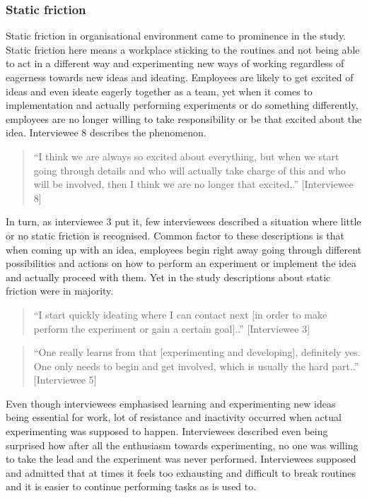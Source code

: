 \subsubsection{Static friction}
Static friction in organisational environment came to prominence in the study.  Static friction here means a workplace sticking to the routines and not being able to act in a different way and experimenting new ways of working regardless of eagerness towards new ideas and ideating. Employees are likely to get excited of ideas and even ideate eagerly together as a team, yet when it comes to implementation and actually performing experiments or do something differently, employees are no longer willing to take responsibility or be that excited about the idea. Interviewee 8 describes the phenomenon.
\begin{quote}
``I think we are always so excited about everything, but when we start going through details and who will actually take charge of this and who will be involved, then I think we are no longer that excited..'' [Interviewee 8]
\end{quote}
In turn, as interviewee 3 put it, few interviewees described a situation where little or no static friction is recognised. Common factor to these descriptions is that when coming up with an idea, employees begin right away going through different possibilities and actions on how to perform an experiment or implement the idea and actually proceed with them. Yet in the study descriptions about static friction were in majority. 
\begin{quote}
``I start quickly ideating where I can contact next [in order to make perform the experiment or gain a certain goal]..'' [Interviewee 3]
\end{quote}
\begin{quote}
``One really learns from that [experimenting and developing], definitely yes. One only needs to begin and get involved, which is usually the hard part..'' [Interviewee 5]
\end{quote}
Even though interviewees emphasised learning and experimenting new ideas being essential for work, lot of resistance and inactivity occurred when actual experimenting was supposed to happen. Interviewees described even being surprised how after all the enthusiasm towards experimenting, no one was willing to take the lead and the experiment was never performed. Interviewees supposed and admitted that at times it feels too exhausting and difficult to break routines and it is easier to continue performing tasks as is used to. 


